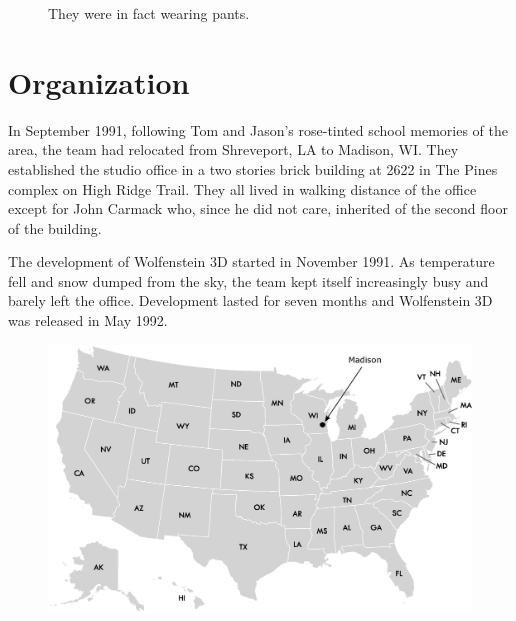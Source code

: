 \documentclass[book.tex]{subfiles}
\begin{document}
\begin{figure}[H]
\centering
  
    
\caption{They were in fact wearing pants.}
\label{fig:id_team_1993}
\end{figure}

\section{Organization}

In September 1991, following Tom and Jason's rose-tinted school memories of the area, the team had relocated from Shreveport, LA to Madison, WI. They established the studio office in a two stories brick building at 2622 in The Pines complex on High Ridge Trail. They all lived in walking distance of the office except for John Carmack who, since he did not care, inherited of the second floor of the building.\\
\par
The development of Wolfenstein 3D started in November 1991. As temperature fell and snow dumped from the sky, the team kept itself increasingly busy and barely left the office. Development lasted for seven months and Wolfenstein 3D was released in May 1992.

\begin{figure}[H]
\centering
 \includegraphics[width=\textwidth]{imgs/drawings/map/usa-id-software.eps}
 \end{figure}


\par
\end{document}
